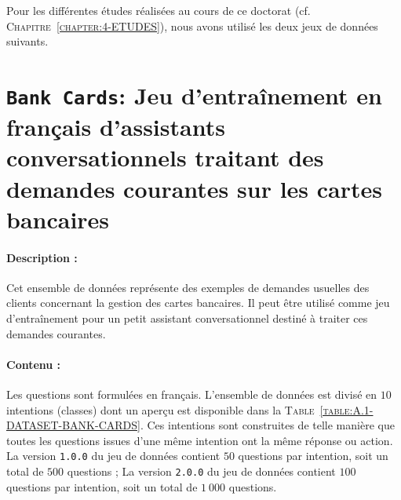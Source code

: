 \DontFrameThisInToc
{}
\label{annex:A-ANNEXE-DATASET}

	Pour les différentes études réalisées au cours de ce doctorat (cf. \textsc{Chapitre~\ref{chapter:4-ETUDES}}), nous avons utilisé les deux jeux de données suivants.

	\minitoc


	\newpage
	\section[
		Jeu de données \texttt{Bank Cards}
	]{
		\texttt{Bank Cards}: Jeu d'entraînement en français d'assistants conversationnels traitant des demandes courantes sur les cartes bancaires
	}
	\label{annex:A.1-DATASET-BANK-CARDS}
		
		
		\paragraph{Description :}
		Cet ensemble de données représente des exemples de demandes usuelles des clients concernant la gestion des cartes bancaires.
		Il peut être utilisé comme jeu d'entraînement pour un petit assistant conversationnel destiné à traiter ces demandes courantes.
		
		\paragraph{Contenu :}
		Les questions sont formulées en français.
		L'ensemble de données est divisé en $10$ intentions (classes) dont un aperçu est disponible dans la \textsc{Table~\ref{table:A.1-DATASET-BANK-CARDS}}.
		Ces intentions sont construites de telle manière que toutes les questions issues d'une même intention ont la même réponse ou action.
		La version \texttt{1.0.0} du jeu de données contient $50$ questions par intention, soit un total de $500$ questions ;
		La version \texttt{2.0.0} du jeu de données contient $100$ questions par intention, soit un total de $1~000$ questions.
		
